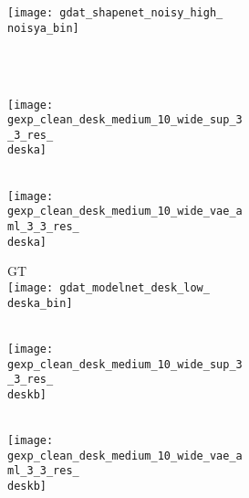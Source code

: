 \begin{figure}[t]
{\begin{subfigure}[t]{0.5\textwidth}
\begin{subfigure}[t]{0.15\textwidth}
            \vspace{0px}\centering
            \texttt{[image: gdat\_shapenet\_noisy\_high\_\\noisya\_bin]}
        \end{subfigure}
    \end{subfigure}
    \\[4px]
    \begin{subfigure}[t]{0.5\textwidth}
       	\vspace{0px}\centering
    	\begin{subfigure}[t]{0.15\textwidth}
    		\vspace{0px}\centering
    		\Dai\\
    		\texttt{[image: gexp\_clean\_desk\_medium\_10\_wide\_sup\_3\_3\_res\_\\deska]}
    	\end{subfigure}
    	\begin{subfigure}[t]{0.15\textwidth}
    		\vspace{0px}\centering
    		\AML\\
    		\texttt{[image: gexp\_clean\_desk\_medium\_10\_wide\_vae\_aml\_3\_3\_res\_\\deska]}
    	\end{subfigure}
    	\begin{subfigure}[t]{0.15\textwidth}
    		\vspace{0px}\centering
    		GT\\
    		\texttt{[image: gdat\_modelnet\_desk\_low\_\\deska\_bin]}
    	\end{subfigure}
    	\begin{subfigure}[t]{0.15\textwidth}
    		\vspace{0px}\centering
    		\Dai\\
    		\texttt{[image: gexp\_clean\_desk\_medium\_10\_wide\_sup\_3\_3\_res\_\\deskb]}
    	\end{subfigure}
    	\begin{subfigure}[t]{0.15\textwidth}
    		\vspace{0px}\centering
    		\AML\\
    		\texttt{[image: gexp\_clean\_desk\_medium\_10\_wide\_vae\_aml\_3\_3\_res\_\\deskb]}

\end{subfigure}
\end{subfigure}}
\end{figure}
